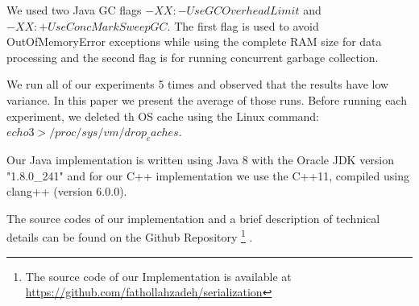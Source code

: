 We used two Java GC flags $-XX:-UseGCOverheadLimit$ and $-XX:+UseConcMarkSweepGC$. The first flag is used to avoid OutOfMemoryError exceptions while using the complete RAM size for data processing and the second flag is for running concurrent garbage collection.

We run all of our experiments 5 times and observed that the results have low variance. In this paper we present the average of those runs. Before running each experiment, we
deleted th OS cache using the Linux command: $echo 3 > /proc/sys/vm/drop_caches$.

Our Java implementation is written using Java 8 with the Oracle JDK version "1.8.0\_241" and for our C++ implementation we use the C++11, compiled using clang++ (version 6.0.0).

The source codes of our implementation and a brief description of technical details can be found on the Github Repository \footnote{The source code of our Implementation is available at \url{https://github.com/fathollahzadeh/serialization}} .
